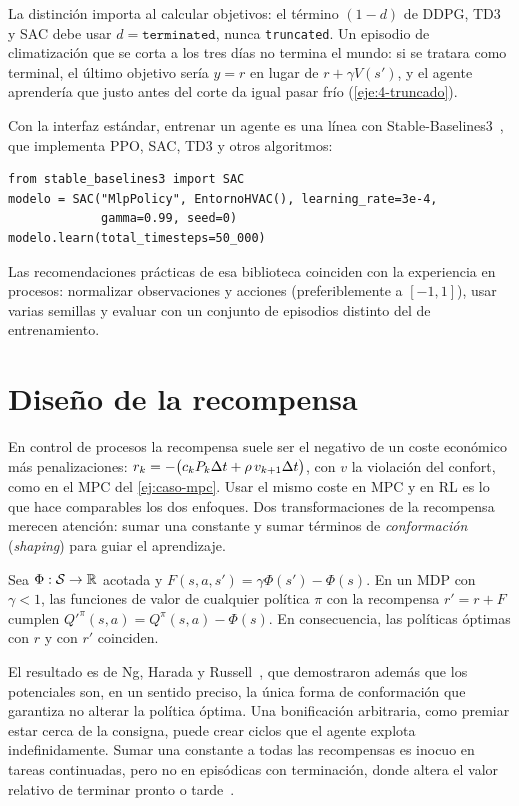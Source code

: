 La distinción importa al calcular objetivos: el término $(1-d)$ de DDPG, TD3 y SAC debe usar $d=\texttt{terminated}$, nunca \texttt{truncated}. Un episodio de climatización que se corta a los tres días no termina el mundo: si se tratara como terminal, el último objetivo sería $y=r$ en lugar de $r+\gamma V(s')$, y el agente aprendería que justo antes del corte da igual pasar frío (\cref{eje:4-truncado}).

Con la interfaz estándar, entrenar un agente es una línea con Stable-Baselines3~\cite{sb3}, que implementa PPO, SAC, TD3 y otros algoritmos:
\begin{verbatim}
from stable_baselines3 import SAC
modelo = SAC("MlpPolicy", EntornoHVAC(), learning_rate=3e-4,
             gamma=0.99, seed=0)
modelo.learn(total_timesteps=50_000)
\end{verbatim}
Las recomendaciones prácticas de esa biblioteca coinciden con la experiencia en procesos: normalizar observaciones y acciones (preferiblemente a $[-1,1]$), usar varias semillas y evaluar con un conjunto de episodios distinto del de entrenamiento.

\section{Diseño de la recompensa}

En control de procesos la recompensa suele ser el negativo de un coste económico más penalizaciones: $r_k=-\bigl(c_kP_k\Delta t+\rho\,v_{k+1}\Delta t\bigr)$, con $v$ la violación del confort, como en el MPC del \cref{ej:caso-mpc}. Usar el mismo coste en MPC y en RL es lo que hace comparables los dos enfoques. Dos transformaciones de la recompensa merecen atención: sumar una constante y sumar términos de \emph{conformación} (\emph{shaping}) para guiar el aprendizaje.

\begin{teorema}\label{teo:shaping}
Sea $\Phi:\mathcal{S}\to\mathbb{R}$ acotada y $F(s,a,s')=\gamma\Phi(s')-\Phi(s)$. En un MDP con $\gamma<1$, las funciones de valor de cualquier política $\pi$ con la recompensa $r'=r+F$ cumplen $Q'^{\pi}(s,a)=Q^{\pi}(s,a)-\Phi(s)$. En consecuencia, las políticas óptimas con $r$ y con $r'$ coinciden.
\end{teorema}

El resultado es de Ng, Harada y Russell~\cite{ng}, que demostraron además que los potenciales son, en un sentido preciso, la única forma de conformación que garantiza no alterar la política óptima. Una bonificación arbitraria, como premiar estar cerca de la consigna, puede crear ciclos que el agente explota indefinidamente. Sumar una constante a todas las recompensas es inocuo en tareas continuadas, pero no en episódicas con terminación, donde altera el valor relativo de terminar pronto o tarde~\cite[ejercicios~3.15 y~3.16]{sb}.

